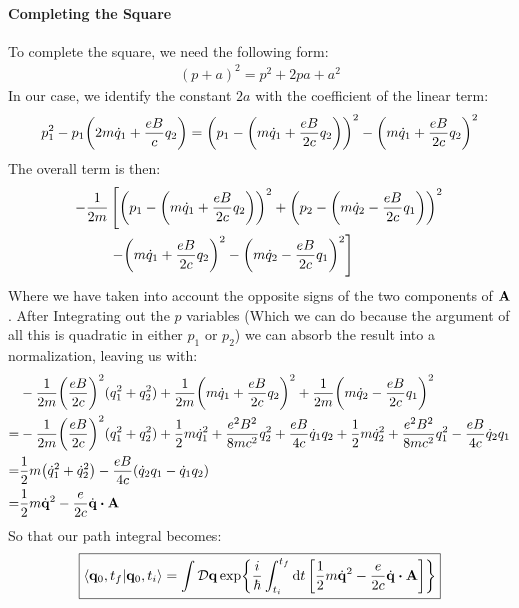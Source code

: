 \documentclass[12pt]{article}
\newcommand{\cD}{\mathcal{D}}
\newcommand{\q}{\vb{q}}
\begin{document}
\paragraph{Completing the Square}
To complete the square, we need the following form:
\begin{align*}
  (p+a)^2=p^2+2pa+a^2
\end{align*}
In our case, we identify the constant $2a$ with the coefficient of the linear term:
\begin{align*}
  p_1^2-p_1\qty(2m\dot{q}_1+\frac{eB}{c}q_2)
  =\qty(p_1-\qty(m\dot{q}_1+\frac{eB}{2c}q_2))^2
  -\qty(m\dot{q}_1+\frac{eB}{2c}q_2)^2
\end{align*}
The overall term is then:
\begin{align*}
  -\frac{1}{2m}
  &\left[
    \qty(p_1-\qty(m\dot{q}_1+\frac{eB}{2c}q_2))^2+
    \qty(p_2-\qty(m\dot{q}_2-\frac{eB}{2c}q_1))^2
  \right. \\
  &\left.
    -\qty(m\dot{q}_1+\frac{eB}{2c}q_2)^2
    -\qty(m\dot{q}_2-\frac{eB}{2c}q_1)^2 \right]
\end{align*}
Where we have taken into account the opposite signs of the two components of $\vb{A}$. After Integrating out the $p$ variables (Which we can do because the argument of all this is quadratic in either $p_1$ or $p_2$) we can absorb the result into a normalization, leaving us with:
\begin{align*}
  &-\frac{1}{2m}\qty(\frac{eB}{2c})^2(q_1^2+q_2^2)
  +\frac{1}{2m}\qty(m\dot{q}_1+\frac{eB}{2c}q_2)^2
  +\frac{1}{2m}\qty(m\dot{q}_2-\frac{eB}{2c}q_1)^2\\
  =&-\frac{1}{2m}\qty(\frac{eB}{2c})^2(q_1^2+q_2^2)
  +\frac{1}{2}m\dot{q}_1^2+\frac{e^2B^2}{8mc^2}q_2^2+\frac{eB}{4c}\dot{q}_1q_2
  +\frac{1}{2}m\dot{q}_2^2+\frac{e^2B^2}{8mc^2}q_1^2-\frac{eB}{4c}\dot{q}_2q_1\\
  =&\frac{1}{2}m\qty(\dot{q}_1^2+\dot{q}_2^2)
  -\frac{eB}{4c}\qty(\dot{q}_2q_1-\dot{q}_1q_2)\\
  =&\frac{1}{2}m\dot{\q}^2-\frac{e}{2c}\dot{\q}\vdot\vb{A}
\end{align*}
So that our path integral becomes:
\begin{align*}
  \boxed{\ip{\q_0,t_f}{\q_0,t_i}=\int\cD{\q}
  \exp{\frac{i}{\hbar}\int_{t_i}^{t_f}\dd{t}
    \qty[\frac{1}{2}m\dot{\q}^2-\frac{e}{2c}\dot{\q}\vdot\vb{A}]}}
\end{align*}
\end{document}
